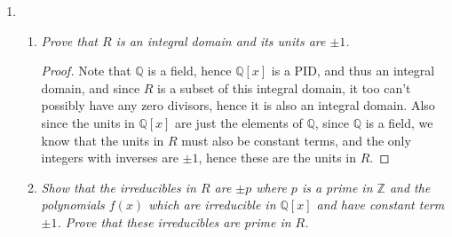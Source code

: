 \documentclass[10pt,oneside,reqno]{amsart}
\theoremstyle{plain}
\theoremstyle{definition}
\begin{document}
\begin{enumerate}
\item[]

\begin{enumerate}
\item \textit{Prove that $R$ is an integral domain and its units are $\pm 1$. }\\

\begin{proof}
Note that $\mathbb{Q}$ is a field, hence $\mathbb{Q}[x]$ is a PID, and thus an integral domain, and since $R$ is a subset of this integral domain, it too can't possibly have any zero divisors, hence it is also an integral domain. Also since the units in $\mathbb{Q}[x]$ are just the elements of $\mathbb{Q}$, since $\mathbb{Q}$ is a field, we know that the units in $R$ must also be constant terms, and the only integers with inverses are $\pm 1$, hence these are the units in $R$. 
\end{proof}
\vspace{3mm}
\item \textit{Show that the irreducibles in $R$ are $\pm p$ where $p$ is a prime in $\mathbb{Z}$ and the polynomials $f(x)$ which are irreducible in $\mathbb{Q}[x]$ and have constant term $\pm 1$. Prove that these irreducibles are prime in $R$. }\\


\end{enumerate}
\end{enumerate}
\end{document}
